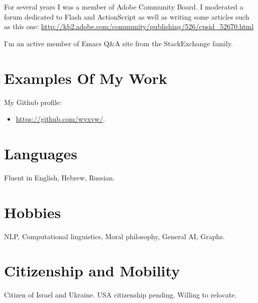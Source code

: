 \documentclass[11pt]{article}
\begin{document}
For several years I was a member of Adobe Community Board. I moderated a forum
dedicated to Flash and ActionScript as well as writing some articles such as
this one: \url{http://kb2.adobe.com/community/publishing/526/cpsid\_52670.html}

I'm an active member of Emacs Q\&A site from the StackExchange family.

\section*{Examples Of My Work}
\label{sec:orgb3bfb47}
My Github profile:
\begin{itemize}
\item \url{https://github.com/wvxvw/}.
\end{itemize}

\section*{Languages}
\label{sec:org0af72b4}
Fluent in English, Hebrew, Russian.

\section*{Hobbies}
\label{sec:org4293289}
NLP, Computational linguistics, Moral philosophy, General AI, Graphs.

\section*{Citizenship and Mobility}
\label{sec:org54fcc7e}
Citizen of Israel and Ukraine.  USA citizenship pending.  Willing
to relocate.
\end{document}
